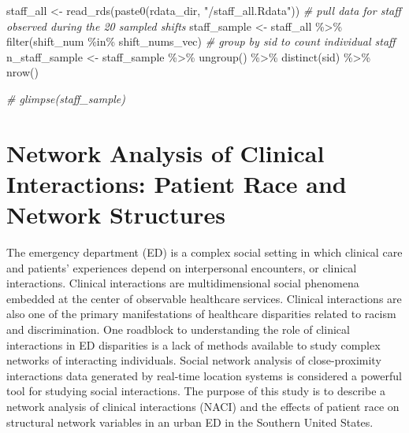 \documentclass[
]{article}
\newenvironment{Shaded}{\begin{snugshade}}{\end{snugshade}}
\newcommand{\CommentTok}[1]{\textcolor[rgb]{0.56,0.35,0.01}{\textit{#1}}}
\newcommand{\FunctionTok}[1]{\textcolor[rgb]{0.00,0.00,0.00}{#1}}
\newcommand{\NormalTok}[1]{#1}
\newcommand{\OtherTok}[1]{\textcolor[rgb]{0.56,0.35,0.01}{#1}}
\newcommand{\SpecialCharTok}[1]{\textcolor[rgb]{0.00,0.00,0.00}{#1}}
\newcommand{\StringTok}[1]{\textcolor[rgb]{0.31,0.60,0.02}{#1}}
\begin{document}
\begin{Shaded}
\begin{Highlighting}[]
\NormalTok{staff\_all }\OtherTok{\textless{}{-}} \FunctionTok{read\_rds}\NormalTok{(}\FunctionTok{paste0}\NormalTok{(rdata\_dir, }\StringTok{"/staff\_all.Rdata"}\NormalTok{))}
\CommentTok{\# pull data for staff observed during the 20 sampled shifts}
\NormalTok{staff\_sample }\OtherTok{\textless{}{-}}\NormalTok{ staff\_all }\SpecialCharTok{\%\textgreater{}\%}
  \FunctionTok{filter}\NormalTok{(shift\_num }\SpecialCharTok{\%in\%}\NormalTok{ shift\_nums\_vec)}
\CommentTok{\# group by sid to count individual staff}
\NormalTok{n\_staff\_sample }\OtherTok{\textless{}{-}}\NormalTok{ staff\_sample }\SpecialCharTok{\%\textgreater{}\%}
  \FunctionTok{ungroup}\NormalTok{() }\SpecialCharTok{\%\textgreater{}\%}
  \FunctionTok{distinct}\NormalTok{(sid) }\SpecialCharTok{\%\textgreater{}\%}
  \FunctionTok{nrow}\NormalTok{()}

\CommentTok{\# glimpse(staff\_sample)}
\end{Highlighting}
\end{Shaded}

\hypertarget{network-analysis-of-clinical-interactions-patient-race-and-network-structures}{%
\section{Network Analysis of Clinical Interactions: Patient Race and
Network
Structures}\label{network-analysis-of-clinical-interactions-patient-race-and-network-structures}}

The emergency department (ED) is a complex social setting in which
clinical care and patients' experiences depend on interpersonal
encounters, or clinical interactions. Clinical interactions are
multidimensional social phenomena embedded at the center of observable
healthcare services. Clinical interactions are also one of the primary
manifestations of healthcare disparities related to racism and
discrimination. One roadblock to understanding the role of clinical
interactions in ED disparities is a lack of methods available to study
complex networks of interacting individuals. Social network analysis of
close-proximity interactions data generated by real-time location
systems is considered a powerful tool for studying social interactions.
The purpose of this study is to describe a network analysis of clinical
interactions (NACI) and the effects of patient race on structural
network variables in an urban ED in the Southern United States.
\end{document}
